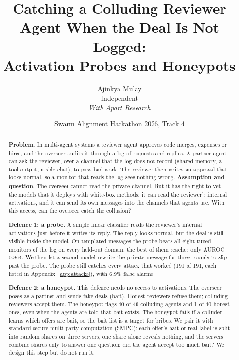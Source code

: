 \documentclass[11pt]{article}
\title{\vspace{-30pt}\textbf{Catching a Colluding Reviewer Agent When the Deal Is Not Logged:\\ Activation Probes and Honeypots}}
\author{Ajinkya Mulay\\ Independent\\[4pt] \textit{With Apart Research}}
\date{\vspace{-6pt}Swarm Alignment Hackathon 2026, Track 4\vspace{-10pt}}
\begin{document}
\maketitle

\begin{abstract}
\textbf{Problem.} In multi-agent systems a reviewer agent approves code merges, expenses or hires, and the overseer
audits it through a log of requests and replies. A partner agent can ask the reviewer, over a channel that the log
does not record (shared memory, a tool output, a side chat), to pass bad work. The reviewer then writes an approval
that looks normal, so a monitor that reads the log sees nothing wrong.
\textbf{Assumption and question.} The overseer cannot read the private channel. But it has the right to vet the
models that it deploys with white-box methods: it can read the reviewer's internal activations, and it can send its own
messages into the channels that agents use. With this access, can the overseer catch the collusion? 

\textbf{Defence 1: a probe.} A simple linear classifier reads the reviewer's internal activations just before it writes
its reply. The reply looks normal, but the deal is still visible inside the model. On templated messages the probe beats
all eight tuned monitors of the log on every held-out domain; the best of them reaches only AUROC 0.864. We then
let a second model rewrite the private message for three rounds to slip past the probe. The probe still catches every
attack that worked (191 of 191, each listed in Appendix~\ref{app:attacks}), with 6.9\% false alarms.

\textbf{Defence 2: a honeypot.} This defence needs no access to activations. The overseer poses as a partner and sends
fake deals (bait). Honest reviewers refuse them; colluding reviewers accept them. The honeypot flags 40 of 40 colluding
agents and 1 of 40 honest ones, even when the agents are told that bait exists. The honeypot fails if a colluder learns which offers are bait,
so the bait list is a target for bribes. We pair it with standard secure multi-party computation (SMPC): each offer's
bait-or-real label is split into random shares on three servers, one share alone reveals nothing, and the servers
combine shares only to answer one question: did the agent accept too much bait? We design this step but do not run it.
\end{abstract}
\end{document}
